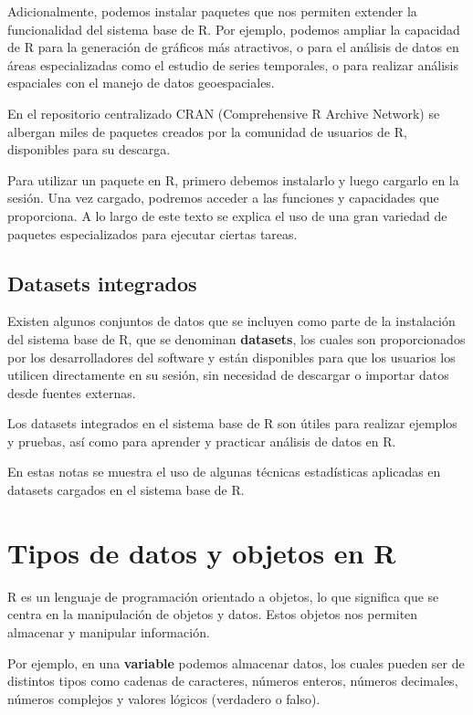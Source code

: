 \documentclass[
]{book}
\begin{document}
Adicionalmente, podemos instalar paquetes que nos permiten extender la funcionalidad del sistema base de R. Por ejemplo, podemos ampliar la capacidad de R para la generación de gráficos más atractivos, o para el análisis de datos en áreas especializadas como el estudio de series temporales, o para realizar análisis espaciales con el manejo de datos geoespaciales.

En el repositorio centralizado CRAN (Comprehensive R Archive Network) se albergan miles de paquetes creados por la comunidad de usuarios de R, disponibles para su descarga.

Para utilizar un paquete en R, primero debemos instalarlo y luego cargarlo en la sesión. Una vez cargado, podremos acceder a las funciones y capacidades que proporciona. A lo largo de este texto se explica el uso de una gran variedad de paquetes especializados para ejecutar ciertas tareas.

\hypertarget{datasets-integrados}{%
\section{Datasets integrados}\label{datasets-integrados}}

Existen algunos conjuntos de datos que se incluyen como parte de la instalación del sistema base de R, que se denominan \textbf{datasets}, los cuales son proporcionados por los desarrolladores del software y están disponibles para que los usuarios los utilicen directamente en su sesión, sin necesidad de descargar o importar datos desde fuentes externas.

Los datasets integrados en el sistema base de R son útiles para realizar ejemplos y pruebas, así como para aprender y practicar análisis de datos en R.

En estas notas se muestra el uso de algunas técnicas estadísticas aplicadas en datasets cargados en el sistema base de R.

\hypertarget{tipos-de-datos-y-objetos-en-r}{%
\chapter{Tipos de datos y objetos en R}\label{tipos-de-datos-y-objetos-en-r}}

R es un lenguaje de programación orientado a objetos, lo que significa que se centra en la manipulación de objetos y datos. Estos objetos nos permiten almacenar y manipular información.

Por ejemplo, en una \textbf{variable} podemos almacenar datos, los cuales pueden ser de distintos tipos como cadenas de caracteres, números enteros, números decimales, números complejos y valores lógicos (verdadero o falso).
\end{document}

